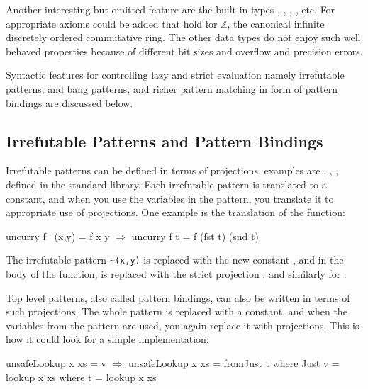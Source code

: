 Another interesting but omitted feature are the built-in types
, , , , etc. For 
appropriate axioms could be added that hold for $\mathbb{Z}$, the
canonical infinite discretely ordered commutative ring.  The other
data types do not enjoy such well behaved properties because of
different bit sizes and overflow and precision errors.

Syntactic features for controlling lazy and strict evaluation namely
irrefutable patterns,  and bang patterns, and richer pattern
matching in form of pattern bindings are discussed below.

\begin{comment}
 It should be
noted that it is already possible to prove a lot of interesting
Haskell properties, it is far from able to prove things about bigger
Haskell projects which usually use a richer part of the language.
\end{comment}

\subsection{Irrefutable Patterns and Pattern Bindings}

Irrefutable patterns can be defined in terms of projections, examples
are , , ,  defined in the
standard library. Each irrefutable pattern is translated to a
constant, and when you use the variables in the pattern, you translate
it to appropriate use of projections. One example is the translation
of the  function:

\begin{code}[mathescape]
uncurry f ~(x,y) = f x y        $\Rightarrow$      uncurry f t = f (fst t) (snd t)
\end{code}

\noindent
The irrefutable pattern \verb:~(x,y): is replaced with the new constant
, and in the body of the function,  is replaced with the
strict projection , and similarly for .

Top level patterns, also called pattern bindings, can
also be written in terms of such projections. The whole pattern
is replaced with a constant, and when the variables from the pattern
are used, you again replace it with projections. This is how it
could look for a simple  implementation:

\begin{code}[mathescape]
unsafeLookup x xs = v           $\Rightarrow$      unsafeLookup x xs = fromJust t
  where Just v = lookup x xs            where t = lookup x xs
\end{code}

